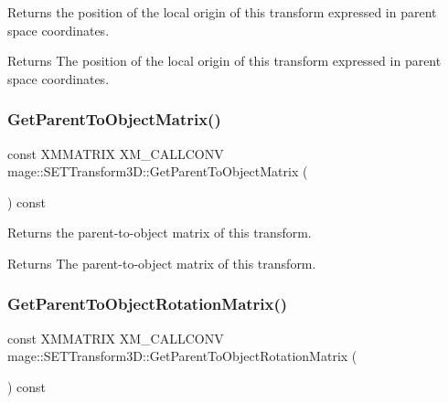 Returns the position of the local origin of this transform expressed in parent space coordinates.

\begin{DoxyReturn}{Returns}
The position of the local origin of this transform expressed in parent space coordinates. 
\end{DoxyReturn}
\mbox{\label{classmage_1_1_s_e_t_transform3_d_a82df0310b9963f106e11b8bb6ad49a1d}} 
\subsubsection{\texorpdfstring{Get\+Parent\+To\+Object\+Matrix()}{GetParentToObjectMatrix()}}
{\footnotesize\ttfamily const X\+M\+M\+A\+T\+R\+IX X\+M\+\_\+\+C\+A\+L\+L\+C\+O\+NV mage\+::\+S\+E\+T\+Transform3\+D\+::\+Get\+Parent\+To\+Object\+Matrix (\begin{DoxyParamCaption}{ }\end{DoxyParamCaption}) const\hspace{0.3cm}{\ttfamily [noexcept]}}

Returns the parent-\/to-\/object matrix of this transform.

\begin{DoxyReturn}{Returns}
The parent-\/to-\/object matrix of this transform. 
\end{DoxyReturn}
\mbox{\label{classmage_1_1_s_e_t_transform3_d_a116c69e964c7f49fc76639c739199ad5}} 
\subsubsection{\texorpdfstring{Get\+Parent\+To\+Object\+Rotation\+Matrix()}{GetParentToObjectRotationMatrix()}}
{\footnotesize\ttfamily const X\+M\+M\+A\+T\+R\+IX X\+M\+\_\+\+C\+A\+L\+L\+C\+O\+NV mage\+::\+S\+E\+T\+Transform3\+D\+::\+Get\+Parent\+To\+Object\+Rotation\+Matrix (\begin{DoxyParamCaption}{ }\end{DoxyParamCaption}) const\hspace{0.3cm}{\ttfamily [noexcept]}}

